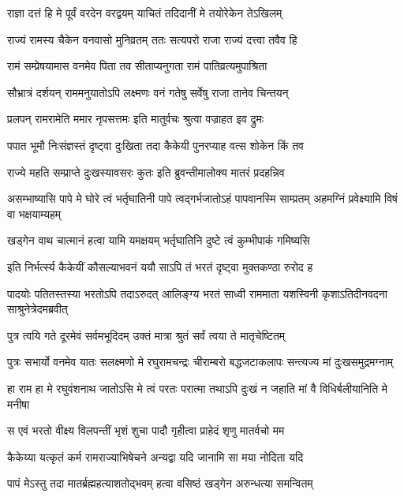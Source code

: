\twolineshloka
{राज्ञा दत्तं हि मे पूर्वं वरदेन वरद्वयम्}
{याचितं तदिदानीं मे तयोरेकेन तेऽखिलम्} %

\twolineshloka
{राज्यं रामस्य चैकेन वनवासो मुनिव्रतम्}
{ततः सत्यपरो राजा राज्यं दत्त्वा तवैव हि} %

\twolineshloka
{रामं सम्प्रेषयामास वनमेव पिता तव}
{सीताप्यनुगता रामं पातिव्रत्यमुपाश्रिता} %

\twolineshloka
{सौभ्रात्रं दर्शयन् राममनुयातोऽपि लक्ष्मणः}
{वनं गतेषु सर्वेषु राजा तानेव चिन्तयन्} %

\twolineshloka
{प्रलपन् रामरामेति ममार नृपसत्तमः}
{इति मातुर्वचः श्रुत्वा वज्राहत इव द्रुमः} %

\twolineshloka
{पपात भूमौ निःसंज्ञस्तं दृष्ट्वा दुःखिता तदा}
{कैकेयी पुनरप्याह वत्स शोकेन किं तव} %

\twolineshloka
{राज्ये महति सम्प्राप्ते दुःखस्यावसरः कुतः}
{इति ब्रुवन्तीमालोक्य मातरं प्रदहन्निव} %

\threelineshloka
{असम्भाष्यासि पापे मे घोरे त्वं भर्तृघातिनी}
{पापे त्वद्गर्भजातोऽहं पापवानस्मि साम्प्रतम्}
{अहमग्निं प्रवेक्ष्यामि विषं वा भक्षयाम्यहम्} %

\twolineshloka
{खड्गेन वाथ चात्मानं हत्वा यामि यमक्षयम्}
{भर्तृघातिनि दुष्टे त्वं कुम्भीपाकं गमिष्यसि} %

\twolineshloka
{इति निर्भर्त्स्य कैकेयीं कौसल्याभवनं ययौ}
{साऽपि तं भरतं दृष्ट्वा मुक्तकण्ठा रुरोद ह} %

\threelineshloka
{पादयोः पतितस्तस्या भरतोऽपि तदाऽरुदत्}
{आलिङ्ग्य भरतं साध्वी राममाता यशस्विनी}
{कृशाऽतिदीनवदना साश्रुनेत्रेदमब्रवीत्} %

\twolineshloka
{पुत्र त्वयि गते दूरमेवं सर्वमभूदिदम्}
{उक्तं मात्रा श्रुतं सर्वं त्वया ते मातृचेष्टितम्} %

\fourlineindentedshloka
{पुत्रः सभार्यो वनमेव यातः}
{सलक्ष्मणो मे रघुरामचन्द्रः}
{चीराम्बरो बद्धजटाकलापः}
{सन्त्यज्य मां दुःखसमुद्रमग्नाम्} %

\fourlineindentedshloka
{हा राम हा मे रघुवंशनाथ}
{जातोऽसि मे त्वं परतः परात्मा}
{तथाऽपि दुःखं न जहाति मां वै}
{विधिर्बलीयानिति मे मनीषा} %

\twolineshloka
{स एवं भरतो वीक्ष्य विलपन्तीं भृशं शुचा}
{पादौ गृहीत्वा प्राहेदं शृणु मातर्वचो मम} %

\twolineshloka
{कैकेय्या यत्कृतं कर्म रामराज्याभिषेचने}
{अन्यद्वा यदि जानामि सा मया नोदिता यदि} %

\twolineshloka
{पापं मेऽस्तु तदा मातर्ब्रह्महत्याशतोद्भवम्}
{हत्वा वसिष्ठं खड्गेन अरुन्धत्या समन्वितम्} %

